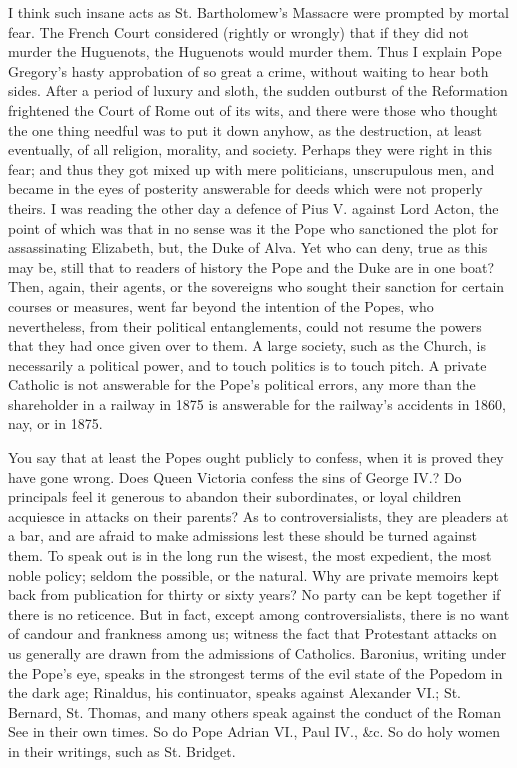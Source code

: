 I think such insane acts as St. Bartholomew's
Massacre were prompted by mortal fear. The French Court considered
(rightly or wrongly) that if they did not murder the Huguenots, the
Huguenots would murder them. Thus I explain Pope Gregory's hasty
approbation of so great a crime, without waiting to hear both sides.
After a period of luxury and sloth, the sudden outburst of the
Reformation frightened the Court of Rome out of its wits, and there
were those who thought the one thing needful was to put it down
anyhow, as the destruction, at least eventually, of all religion,
morality, and society. Perhaps they were right in this fear; and thus
they got mixed up with mere politicians, unscrupulous men, and became
in the eyes of posterity answerable for deeds which were not properly
theirs. I was reading the other day a defence of Pius V. against Lord
Acton, the point of which was that in no sense was it the Pope who
sanctioned the plot for assassinating Elizabeth, but, the Duke of
Alva. Yet who can deny, true as this may be, still that to readers of
history the Pope and the Duke are in one boat? Then, again, their
agents, or the sovereigns who sought their sanction for certain
courses or measures, went far beyond the intention of the Popes, who
nevertheless, from their political entanglements, could not resume the
powers that they had once given over to them. A large society, such as
the Church, is necessarily a political power, and to touch politics is
to touch pitch. A private Catholic is not answerable for the Pope's
political errors, any more than the shareholder in a railway in 1875
is answerable for the railway's accidents in 1860, nay, or in 1875.

You say that at least the Popes ought publicly to
confess, when it is proved they have gone wrong. Does Queen Victoria
confess the sins of George IV.? Do principals feel it generous to
abandon their subordinates, or loyal children acquiesce in attacks on
their parents? As to controversialists, they are pleaders at a bar,
and are afraid to make admissions lest these should be turned against
them. To speak out is in the long run the wisest, the most expedient,
the most noble policy; seldom the possible, or the natural. Why are
private memoirs kept back from publication for thirty or sixty years?
No party can be kept together if there is no reticence. But in fact,
except among controversialists, there is no want of candour and
frankness among us; witness the fact that Protestant attacks on us
generally are drawn from the admissions of Catholics. Baronius,
writing under the Pope's eye, speaks in the strongest terms of the
evil state of the Popedom in the dark age; Rinaldus, his continuator,
speaks against Alexander VI.; St. Bernard, St. Thomas, and many others
speak against the conduct of the Roman See in their own times. So do
Pope Adrian VI., Paul IV., \&c. So do holy women in their writings,
such as St. Bridget.

